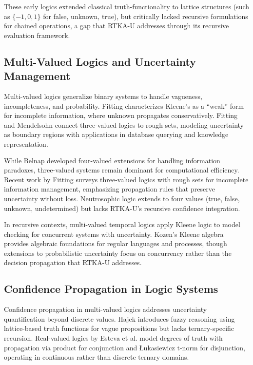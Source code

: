 \documentclass[11pt,a4paper]{article}
\begin{document}
These early logics extended classical truth-functionality to lattice structures (such as $\{-1, 0, 1\}$ for false, unknown, true), but critically lacked recursive formulations for chained operations, a gap that RTKA-U addresses through its recursive evaluation framework.

\subsection{Multi-Valued Logics and Uncertainty Management}

Multi-valued logics generalize binary systems to handle vagueness, incompleteness, and probability. Fitting \cite{fitting1991} characterizes Kleene's as a ``weak'' form for incomplete information, where unknown propagates conservatively. Fitting and Mendelsohn \cite{fitting1998} connect three-valued logics to rough sets, modeling uncertainty as boundary regions with applications in database querying and knowledge representation.

While Belnap \cite{belnap1975} developed four-valued extensions for handling information paradoxes, three-valued systems remain dominant for computational efficiency. Recent work by Fitting \cite{fitting2023} surveys three-valued logics with rough sets for incomplete information management, emphasizing propagation rules that preserve uncertainty without loss. Neutrosophic logic \cite{smarandache2005} extends to four values (true, false, unknown, undetermined) but lacks RTKA-U's recursive confidence integration.

In recursive contexts, multi-valued temporal logics \cite{chechik2001} apply Kleene logic to model checking for concurrent systems with uncertainty. Kozen's Kleene algebra \cite{kozen1994} provides algebraic foundations for regular languages and processes, though extensions to probabilistic uncertainty \cite{kozen2013} focus on concurrency rather than the decision propagation that RTKA-U addresses.

\subsection{Confidence Propagation in Logic Systems}

Confidence propagation in multi-valued logics addresses uncertainty quantification beyond discrete values. Hajek \cite{hajek1998} introduces fuzzy reasoning using lattice-based truth functions for vague propositions but lacks ternary-specific recursion. Real-valued logics by Esteva et al. \cite{esteva2000} model degrees of truth with propagation via product for conjunction and Łukasiewicz t-norm for disjunction, operating in continuous rather than discrete ternary domains.
\end{document}
